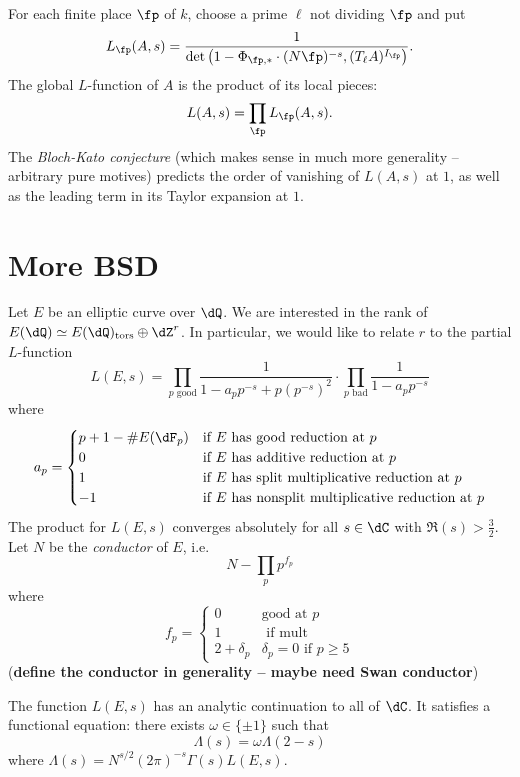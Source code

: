 \documentclass{article}
\begin{document}
For each finite place $\fp$ of $k$, choose a prime $\ell$ not dividing $\fp$ 
and put 
\[
  L_\fp(A,s) = \frac{1}{\det\left(1-\Phi_{\fp,\ast} \cdot (N\fp)^{-s}, (T_\ell A)^{I_\fp}\right)} \text{.}
\]
The global $L$-function of $A$ is the product of its local pieces:
\[
  L(A,s) = \prod_\fp L_\fp(A,s) \text{.}
\]
The \emph{Bloch-Kato conjecture} (which makes sense in much more generality -- 
arbitrary pure motives) predicts the order of vanishing of 
$L(A,s)$ at $1$, as well as the leading term in its Taylor expansion at 
$1$. 







\section{More BSD}

Let $E$ be an elliptic curve over $\dQ$. We are interested in the rank of 
$E(\dQ)\simeq E(\dQ)_\text{tors}\oplus \dZ^r$. In particular, we would like to 
relate $r$ to the partial $L$-function 
\[
  L(E,s) = \prod_{p\text{ good}} \frac{1}{1-a_p p^{-s} + p (p^{-s})^2} \cdot \prod_{p\text{ bad}} \frac{1}{1-a_p p^{-s}} 
\]
where 
\[
  a_p 
    = \begin{cases}
        p+1-\# E(\dF_p) & \text{if $E$ has good reduction at $p$} \\
        0               & \text{if $E$ has additive reduction at $p$} \\
        1               & \text{if $E$ has split multiplicative reduction at $p$} \\
        -1              & \text{if $E$ has nonsplit multiplicative reduction at $p$}
      \end{cases}
\]
The product for $L(E,s)$ converges absolutely for all $s\in \dC$ with 
$\Re (s)>\frac 3 2$. Let $N$ be the \emph{conductor} of $E$, i.e. 
\[
  N - \prod_p p^{f_p}
\]
where 
\[
  f_p = 
    \begin{cases} 
      0 & \text{good at $p$} \\ 
      1 & \text{ if mult} \\
       2+\delta_p & \text{$\delta_p=0$ if $p\geqslant 5$} 
       \end{cases}
\]
(\textbf{define the conductor in generality -- maybe need Swan conductor})

\begin{theorem}
The function $L(E,s)$ has an analytic continuation to all of $\dC$. It 
satisfies a functional equation: there exists $\omega\in \{\pm 1\}$ such that 
\[
  \Lambda(s) = \omega \Lambda(2-s)
\]
where $\Lambda(s) = N^{s/2} (2\pi)^{-s} \Gamma(s) L(E,s)$. 
\end{theorem}
\end{document}
